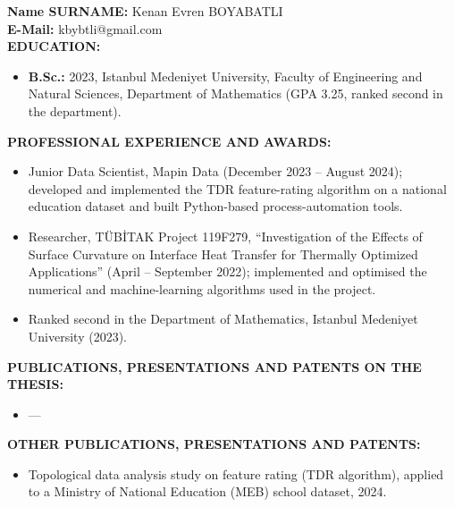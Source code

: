 \vspace{10mm}

\textbf{Name SURNAME:} Kenan Evren BOYABATLI \\

\vspace{-3mm}
\textbf{E-Mail:} kbybtli@gmail.com \\

\textbf{EDUCATION:}
\vspace{-3mm}
\begin{itemize}
  \item \textbf{B.Sc.:} 2023, Istanbul Medeniyet University, Faculty of Engineering and Natural Sciences, Department of Mathematics (GPA 3.25, ranked second in the department).
\end{itemize}

\textbf{PROFESSIONAL EXPERIENCE AND AWARDS:}
\vspace{-3mm}
\begin{itemize}
  \item Junior Data Scientist, Mapin Data (December 2023 -- August 2024); developed and implemented the TDR feature-rating algorithm on a national education dataset and built Python-based process-automation tools.
  \item Researcher, T\"UB\.ITAK Project 119F279, ``Investigation of the Effects of Surface Curvature on Interface Heat Transfer for Thermally Optimized Applications'' (April -- September 2022); implemented and optimised the numerical and machine-learning algorithms used in the project.
  \item Ranked second in the Department of Mathematics, Istanbul Medeniyet University (2023).
\end{itemize}

\textbf{PUBLICATIONS, PRESENTATIONS AND PATENTS ON THE THESIS:}
\vspace{-3mm}
\begin{itemize}
  \item ---
\end{itemize}

\newpage

\textbf{OTHER PUBLICATIONS, PRESENTATIONS AND PATENTS:}
\vspace{-3mm}
\begin{itemize}
  \item Topological data analysis study on feature rating (TDR algorithm), applied to a Ministry of National Education (MEB) school dataset, 2024.
\end{itemize}
\vspace{-3mm}

